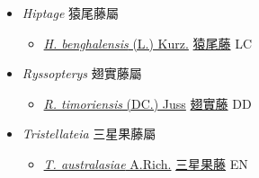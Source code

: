 
  \begin{itemize}
 \item[] \textit{Hiptage} 猿尾藤屬
                    
  \begin{itemize}
        \item[] \href{http://www.theplantlist.org/tpl1.1/search?q=Hiptage+benghalensis}{\textit{H. benghalensis} (L.) Kurz.}   \href{\detokenize{http://taibnet.sinica.edu.tw/chi/taibnet_species_list.php?T2=猿尾藤&T2_new_value=true&fr=y}}{猿尾藤} LC
  \end{itemize}
 \item[] \textit{Ryssopterys} 翅實藤屬
                    
  \begin{itemize}
        \item[] \href{http://www.theplantlist.org/tpl1.1/search?q=Ryssopterys+timoriensis}{\textit{R. timoriensis} (DC.) Juss}   \href{\detokenize{http://taibnet.sinica.edu.tw/chi/taibnet_species_list.php?T2=翅實藤&T2_new_value=true&fr=y}}{翅實藤} DD
  \end{itemize}
 \item[] \textit{Tristellateia} 三星果藤屬
                    
  \begin{itemize}
        \item[] \href{http://www.theplantlist.org/tpl1.1/search?q=Tristellateia+australasiae}{\textit{T. australasiae} A.Rich.}   \href{\detokenize{http://taibnet.sinica.edu.tw/chi/taibnet_species_list.php?T2=三星果藤&T2_new_value=true&fr=y}}{三星果藤} EN
  \end{itemize}
  \end{itemize}
